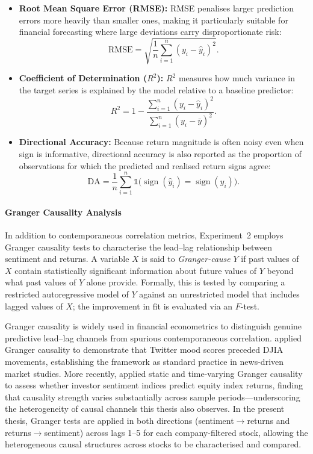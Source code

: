 \documentclass[12pt]{ucetd}
\begin{document}
\begin{itemize}
    \item \textbf{Root Mean Square Error (RMSE):}
    RMSE penalises larger prediction errors more heavily than smaller ones, making it particularly suitable for financial forecasting where large deviations carry disproportionate risk:
    \[
        \text{RMSE} =
        \sqrt{
        \frac{1}{n}
        \sum_{i=1}^{n}
        \left( y_i - \hat{y}_i \right)^2
        }.
    \]

    \item \textbf{Coefficient of Determination ($R^2$):}
    $R^2$ measures how much variance in the target series is explained by the model relative to a baseline predictor:
    \[
        R^2 = 1 - \frac{\sum_{i=1}^{n} (y_i - \hat{y}_i)^2}{\sum_{i=1}^{n} (y_i - \bar{y})^2}.
    \]

    \item \textbf{Directional Accuracy:}
    Because return magnitude is often noisy even when sign is informative, directional accuracy is also reported as the proportion of observations for which the predicted and realised return signs agree:
    \[
        \text{DA} = \frac{1}{n}\sum_{i=1}^{n}\mathbb{1}\big(\operatorname{sign}(\hat{y}_i)=\operatorname{sign}(y_i)\big).
    \]
\end{itemize}

\paragraph{Granger Causality Analysis}

In addition to contemporaneous correlation metrics, Experiment~2 employs Granger causality tests to characterise the lead--lag relationship between sentiment and returns. A variable $X$ is said to \emph{Granger-cause} $Y$ if past values of $X$ contain statistically significant information about future values of $Y$ beyond what past values of $Y$ alone provide. Formally, this is tested by comparing a restricted autoregressive model of $Y$ against an unrestricted model that includes lagged values of $X$; the improvement in fit is evaluated via an $F$-test.

Granger causality is widely used in financial econometrics to distinguish genuine predictive lead--lag channels from spurious contemporaneous correlation. \citet{bollen2011twitter} applied Granger causality to demonstrate that Twitter mood scores preceded DJIA movements, establishing the framework as standard practice in news-driven market studies. More recently, \citet{farrell2025granger} applied static and time-varying Granger causality to assess whether investor sentiment indices predict equity index returns, finding that causality strength varies substantially across sample periods---underscoring the heterogeneity of causal channels this thesis also observes. In the present thesis, Granger tests are applied in both directions (sentiment$\to$returns and returns$\to$sentiment) across lags 1--5 for each company-filtered stock, allowing the heterogeneous causal structures across stocks to be characterised and compared.
\end{document}
